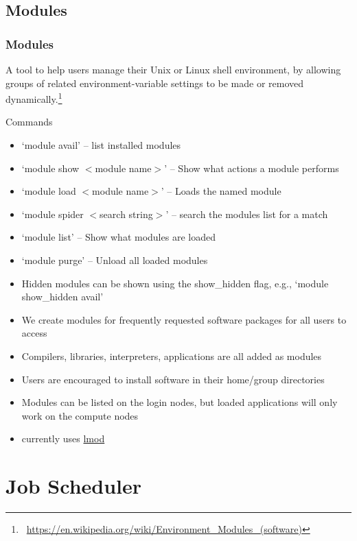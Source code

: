 \subsection{Modules}
\begin{frame}
	\frametitle{Modules}\footnotesize

	  A tool to help users manage their Unix or Linux shell environment, by allowing groups of related environment-variable settings to be made or removed dynamically.\footnote{\label{wiki_module}\tiny\
             \url{https://en.wikipedia.org/wiki/Environment_Modules_(software)}}
	\begin{block}{Commands}
	  \begin{itemize}\footnotesize
			\item `module avail' -- list installed modules
			\item `module show $<$module name$>$' -- Show what actions a module performs
			\item `module load $<$module name$>$' -- Loads the named module
                        \item `module spider $<$search string$>$' -- search the modules list for a match
                        \item `module list' -- Show what modules are loaded
			\item `module purge' -- Unload all loaded modules
		\end{itemize}
        \end{block}
	\begin{itemize}\footnotesize
                \item Hidden modules can be shown using the \ddash{}show\_hidden flag, e.g., `module \ddash{}show\_hidden avail'
	        \item We create modules for frequently requested software packages for all users to access
		\item Compilers, libraries, interpreters, applications are all added as modules
		\item Users are encouraged to install software in their home/group directories
		\item Modules can be listed on the login nodes, but loaded applications will only work on the compute nodes
                \item {\mana} currently uses \href{https://lmod.readthedocs.io/en/latest/010\_user.html}{lmod}
	\end{itemize}
\end{frame}

\section[Job Scheduler]{Job Scheduler}


